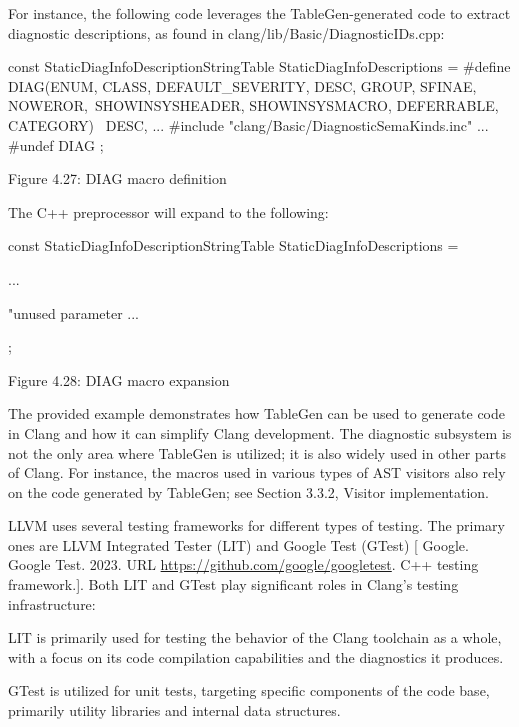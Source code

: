 For instance, the following code leverages the TableGen-generated code to extract diagnostic descriptions, as found in clang/lib/Basic/DiagnosticIDs.cpp:

\begin{cpp}
const StaticDiagInfoDescriptionStringTable StaticDiagInfoDescriptions = {
  #define DIAG(ENUM, CLASS, DEFAULT_SEVERITY, DESC, GROUP, SFINAE, NOWEROR,\
    SHOWINSYSHEADER, SHOWINSYSMACRO, DEFERRABLE, CATEGORY)    \
    DESC,
    ...
    #include "clang/Basic/DiagnosticSemaKinds.inc"
    ...
    #undef DIAG
};
\end{cpp}

\begin{center}
Figure 4.27: DIAG macro definition
\end{center}

The C++ preprocessor will expand to the following:

\begin{cpp}
const StaticDiagInfoDescriptionStringTable StaticDiagInfoDescriptions = {
    ...

    "unused parameter %
    ...
};
\end{cpp}

\begin{center}
Figure 4.28: DIAG macro expansion
\end{center}

The provided example demonstrates how TableGen can be used to generate code in Clang and how it can simplify Clang development. The diagnostic subsystem is not the only area where TableGen is utilized; it is also widely used in other parts of Clang. For instance, the macros used in various types of AST visitors also rely on the code generated by TableGen; see Section 3.3.2, Visitor implementation.

\mySubsubsection{4.5.2.}{LLVM test framework}

LLVM uses several testing frameworks for different types of testing. The primary ones are LLVM Integrated Tester (LIT) and Google Test (GTest) [ Google. Google Test. 2023. URL \url{https://github.com/google/googletest}. C++ testing framework.]. Both LIT and GTest play significant roles in Clang's testing infrastructure:

LIT is primarily used for testing the behavior of the Clang toolchain as a whole, with a focus on its code compilation capabilities and the diagnostics it produces.

GTest is utilized for unit tests, targeting specific components of the code base, primarily utility libraries and internal data structures.


